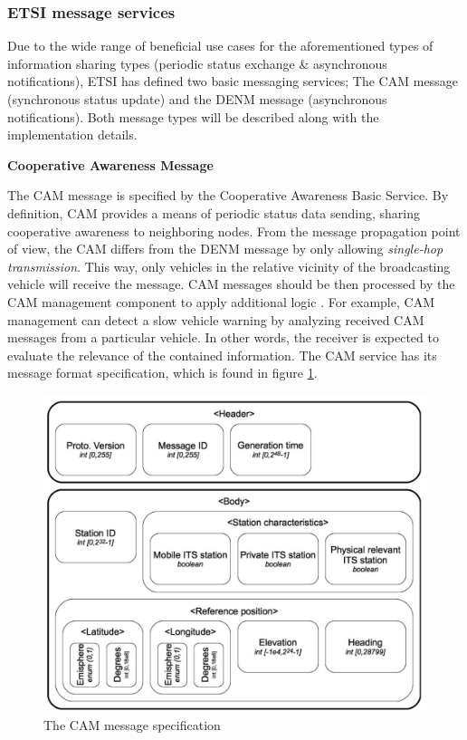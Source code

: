 \documentclass[0main.tex]{subfiles}
\begin{document}
\subsubsection{ETSI message services}

Due to the wide range of beneficial use cases for the aforementioned types of information sharing
types (periodic status exchange \& asynchronous notifications), ETSI has defined two basic
messaging services; The CAM message (synchronous status update) and the DENM message
(asynchronous notifications). Both message types will be described along with the implementation 
details. 

\textbf{Cooperative Awareness Message}

The CAM message is specified by the Cooperative Awareness Basic Service. By definition, CAM
provides a means of periodic status data sending, sharing cooperative awareness to neighboring
nodes. From the message propagation point of view, the CAM differs from the DENM message by 
only allowing \emph{single-hop transmission}. This way, only vehicles in the relative vicinity 
of the broadcasting vehicle will receive the message. CAM messages should be then processed by 
the CAM management component to apply additional logic \cite{ETSI2014}. For example, CAM management can 
detect a slow vehicle warning by analyzing received CAM messages from a particular vehicle. 
In other words, the receiver is expected to evaluate the relevance of the contained information.
The CAM service has its message format specification, which is found in figure \ref{cam-spec}. 

\begin{figure}[htbp]
    \centering
    \includegraphics[width=.9\textwidth]{cam-spec.png} 
    \caption{The CAM message specification \cite{Santa2013}}
    \label{cam-spec}
\end{figure}
\end{document}

